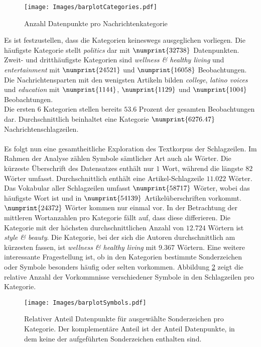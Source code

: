 \documentclass[a4paper,11pt]{article}
\begin{document}
\begin{figure}[ht]
    \centering
\texttt{[image: Images/barplotCategories.pdf]} 
\caption{Anzahl Datenpunkte pro Nachrichtenkategorie}
\label{abb:barplotCategories}
\end{figure}

Es ist festzustellen, dass die Kategorien keineswegs ausgeglichen vorliegen. Die häufigste Kategorie stellt \textit{politics} dar mit $\numprint{32738}$ Datenpunkten. Zweit- und dritthäufigste Kategorien sind \textit{wellness \& healthy living} und \textit{entertainment} mit $\numprint{24521}$ und $\numprint{16058}$ Beobachtungen. Die Nachrichtensparten mit den wenigsten Artikeln bilden \textit{college}, \textit{latino voices} und \textit{education} mit $\numprint{1144}$, $\numprint{1129}$ und $\numprint{1004}$ Beobachtungen.\\
Die ersten $6$ Kategorien stellen bereits $53.6$ Prozent der gesamten Beobachtungen dar. Durchschnittlich beinhaltet eine Kategorie $\numprint{6276.47}$ Nachrichtenschlagzeilen.\\
\\
Es folgt nun eine gesamtheitliche Exploration des Textkorpus der Schlagzeilen. Im Rahmen der Analyse zählen Symbole sämtlicher Art auch als Wörter. Die kürzeste Überschrift des Datensatzes enthält nur $1$ Wort, während die längste $82$ Wörter umfasst. Durchschnittlich enthält eine Artikel-Schlagzeile $11.022$ Wörter. Das Vokabular aller Schlagzeilen umfasst $\numprint{58717}$ Wörter, wobei  das häufigste Wort ist und in $\numprint{54139}$ Artikelüberschriften vorkommt. $\numprint{24372}$ Wörter kommen nur einmal vor. In der Betrachtung der mittleren Wortanzahlen pro Kategorie fällt auf, dass diese differieren. Die Kategorie mit der höchsten durchschnittlichen Anzahl von $12.724$ Wörtern ist \textit{style \& beauty}. Die Kategorie, bei der sich die Autoren durchschnittlich am kürzesten fassen, ist \textit{wellness \& healthy living} mit $9.367$ Wörtern. Eine weitere interessante Fragestellung ist, ob in den Kategorien bestimmte Sonderzeichen oder Symbole besonders häufig oder selten vorkommen. Abbildung \ref{abb:barplotSymbols} zeigt die relative Anzahl der Vorkommnisse verschiedener Symbole in den Schlagzeilen pro Kategorie.

\begin{figure}[ht]
    \centering
\texttt{[image: Images/barplotSymbols.pdf]} 
\caption{Relativer Anteil Datenpunkte für ausgewählte Sonderzeichen pro Kategorie. Der komplementäre Anteil ist der Anteil Datenpunkte, in dem keine der aufgeführten Sonderzeichen enthalten sind.}
\label{abb:barplotSymbols}
\end{figure}
\end{document}
